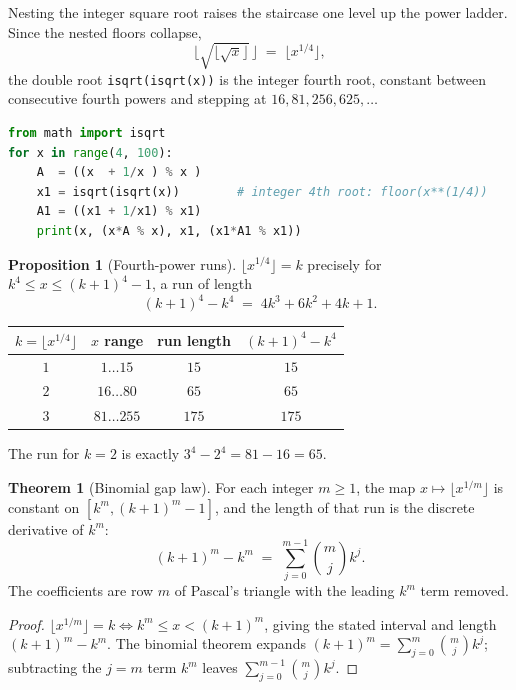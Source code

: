 \documentclass[11pt]{article}
\theoremstyle{definition}
\newtheorem{proposition}{Proposition}
\newtheorem{theorem}{Theorem}
\begin{document}
Nesting the integer square root raises the staircase one level up the power
ladder. Since the nested floors collapse,
\[
  \bigl\lfloor \sqrt{\lfloor \sqrt x\rfloor}\,\bigr\rfloor
  \;=\; \bigl\lfloor x^{1/4}\bigr\rfloor,
\]
the double root \texttt{isqrt(isqrt(x))} is the integer fourth root, constant
between consecutive fourth powers and stepping at $16,81,256,625,\dots$

\begin{lstlisting}[language=Python]
from math import isqrt
for x in range(4, 100):
    A  = ((x  + 1/x ) % x )
    x1 = isqrt(isqrt(x))        # integer 4th root: floor(x**(1/4))
    A1 = ((x1 + 1/x1) % x1)
    print(x, (x*A % x), x1, (x1*A1 % x1))
\end{lstlisting}

\begin{proposition}[Fourth-power runs]
$\lfloor x^{1/4}\rfloor = k$ precisely for $k^{4}\le x\le(k+1)^{4}-1$, a run of
length
\[
  (k+1)^{4}-k^{4} \;=\; 4k^{3}+6k^{2}+4k+1 .
\]
\end{proposition}

\begin{center}
\begin{tabular}{c c c c}
\hline
$k=\lfloor x^{1/4}\rfloor$ & $x$ range & run length & $(k+1)^4-k^4$\\
\hline
$1$ & $1\ldots15$   & $15$  & $15$\\
$2$ & $16\ldots80$  & $65$  & $65$\\
$3$ & $81\ldots255$ & $175$ & $175$\\
\hline
\end{tabular}
\end{center}

\noindent The run for $k=2$ is exactly $3^{4}-2^{4}=81-16=65$.

\begin{theorem}[Binomial gap law]\label{thm:gaplaw}
For each integer $m\ge 1$, the map $x\mapsto\lfloor x^{1/m}\rfloor$ is constant
on $[k^{m},(k+1)^{m}-1]$, and the length of that run is the discrete derivative
of $k^{m}$:
\[
  (k+1)^{m}-k^{m} \;=\; \sum_{j=0}^{m-1}\binom{m}{j}k^{j}.
\]
The coefficients are row $m$ of Pascal's triangle with the leading $k^{m}$ term
removed.
\end{theorem}

\begin{proof}
$\lfloor x^{1/m}\rfloor=k \iff k^{m}\le x<(k+1)^{m}$, giving the stated interval
and length $(k+1)^{m}-k^{m}$. The binomial theorem expands
$(k+1)^{m}=\sum_{j=0}^{m}\binom{m}{j}k^{j}$; subtracting the $j=m$ term $k^{m}$
leaves $\sum_{j=0}^{m-1}\binom{m}{j}k^{j}$.
\end{proof}
\end{document}
